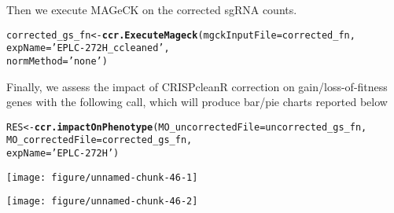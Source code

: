 \documentclass{article}\usepackage[]{graphicx}\usepackage[]{color}
\makeatletter
\def\maxwidth{ %
  \ifdim\Gin@nat@width>\linewidth
    \linewidth
  \else
    \Gin@nat@width
  \fi
}
\newcommand{\hlstr}[1]{\textcolor[rgb]{0.192,0.494,0.8}{#1}}%
\newcommand{\hlstd}[1]{\textcolor[rgb]{0.345,0.345,0.345}{#1}}%
\newcommand{\hlkwb}[1]{\textcolor[rgb]{0.69,0.353,0.396}{#1}}%
\newcommand{\hlkwc}[1]{\textcolor[rgb]{0.333,0.667,0.333}{#1}}%
\newcommand{\hlkwd}[1]{\textcolor[rgb]{0.737,0.353,0.396}{\textbf{#1}}}%
\newenvironment{kframe}{%
 \def\at@end@of@kframe{}%
 \ifinner\ifhmode%
  \def\at@end@of@kframe{\end{minipage}}%
  \begin{minipage}{\columnwidth}%
 \fi\fi%
 \def\FrameCommand##1{\hskip\@totalleftmargin \hskip-\fboxsep
 \colorbox{shadecolor}{##1}\hskip-\fboxsep
     \hskip-\linewidth \hskip-\@totalleftmargin \hskip\columnwidth}%
 \MakeFramed {\advance\hsize-\width
   \@totalleftmargin\z@ \linewidth\hsize
   \@setminipage}}%
 {\par\unskip\endMakeFramed%
 \at@end@of@kframe}
\newenvironment{knitrout}{}{} %
\makeatother
\begin{document}
Then we execute MAGeCK on the corrected sgRNA counts.

\begin{knitrout}
\color{fgcolor}\begin{kframe}
\begin{alltt}
\hlstd{corrected_gs_fn}\hlkwb{<-}\hlkwd{ccr.ExecuteMageck}\hlstd{(}\hlkwc{mgckInputFile} \hlstd{= corrected_fn,}
                                   \hlkwc{expName} \hlstd{=} \hlstr{'EPLC-272H_ccleaned'}\hlstd{,}
                                   \hlkwc{normMethod} \hlstd{=} \hlstr{'none'}\hlstd{)}
\end{alltt}
\end{kframe}
\end{knitrout}

Finally, we assess the impact of CRISPcleanR correction on gain/loss-of-fitness genes with the following call, which
will produce bar/pie charts reported below
\begin{knitrout}
\color{fgcolor}\begin{kframe}
\begin{alltt}
\hlstd{RES}\hlkwb{<-}\hlkwd{ccr.impactOnPhenotype}\hlstd{(}\hlkwc{MO_uncorrectedFile} \hlstd{= uncorrected_gs_fn,}
                      \hlkwc{MO_correctedFile} \hlstd{= corrected_gs_fn,}
                      \hlkwc{expName} \hlstd{=} \hlstr{'EPLC-272H'}\hlstd{)}
\end{alltt}
\end{kframe}

{\centering \texttt{[image: figure/unnamed-chunk-46-1]} 

}




{\centering \texttt{[image: figure/unnamed-chunk-46-2]} 

}



\end{knitrout}

\printbibliography
\end{document}
